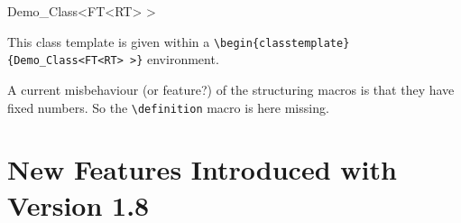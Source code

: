 \documentclass[12pt]{article}
\begin{document}
\begin{classtemplate}{Demo_Class<FT<RT> >}

This class template is given within a
\verb"\begin{classtemplate}{Demo_Class<FT<RT> >}" environment.

\creation

A current misbehaviour (or feature?) of the structuring macros is that
they have fixed numbers. So the \verb"\definition" macro is here
missing.




\operations
\threecolumns{4.3cm}{2.3cm}



\end{classtemplate}

\section{New Features Introduced with Version 1.8}
\end{document}
